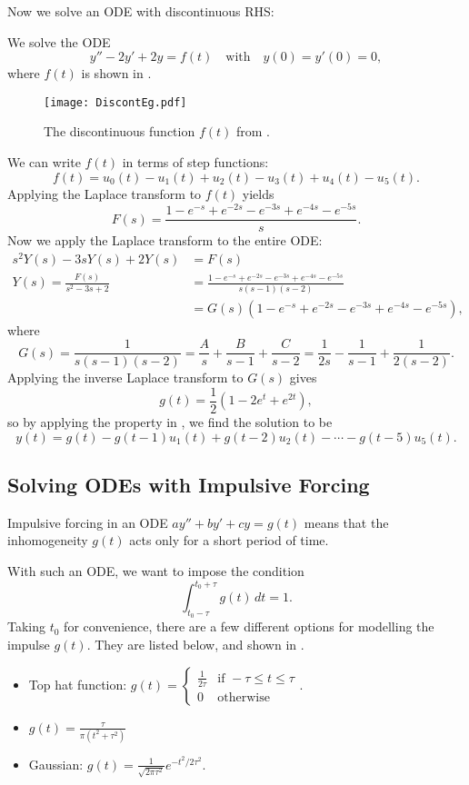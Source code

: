 Now we solve an ODE with discontinuous RHS:

\begin{eg}\label{eg:disconteg}
	We solve the ODE
	\[
	y''-2y'+2y=f(t) \quad\text{with}\quad y(0)=y'(0)=0,
	\]
	where $f(t)$ is shown in . 
	
	\begin{figure}[!ht]
		\centering
		\texttt{[image: DiscontEg.pdf]}
		\caption{The discontinuous function $f(t)$ from .}
		\label{fig:disconteg}
	\end{figure}
	
	We can write $f(t)$ in terms of step functions:
	\[
	f(t) = u_0(t) - u_1(t) + u_2(t) - u_3(t) + u_4(t) - u_5(t).
	\]
	Applying the Laplace transform to $f(t)$ yields
	\[
	F(s) = \frac{1-e^{-s}+e^{-2s}-e^{-3s}+e^{-4s}-e^{-5s}}{s}.
	\]
	Now we apply the Laplace transform to the entire ODE:
	\begin{align*}
		s^2Y(s) - 3sY(s) + 2Y(s) &= F(s) \\
		Y(s) = \frac{F(s)}{s^2-3s+2} &= \frac{1-e^{-s}+e^{-2s}-e^{-3s}+e^{-4s}-e^{-5s}}{s(s-1)(s-2)} \\
		&= G(s)(1-e^{-s}+e^{-2s}-e^{-3s}+e^{-4s}-e^{-5s}),
	\end{align*}
	where
	\[
	G(s) = \frac{1}{s(s-1)(s-2)} = \frac{A}{s} + \frac{B}{s-1} + \frac{C}{s-2} = \frac{1}{2s} - \frac{1}{s-1} + \frac{1}{2(s-2)}.
	\]
	Applying the inverse Laplace transform to $G(s)$ gives
	\[
	g(t) = \frac12\left(1 - 2e^t + e^{2t}\right),
	\]
	so by applying the property in , we find the solution to be
	\[
	y(t) = g(t) - g(t-1)u_1(t) + g(t-2)u_2(t) - \cdots - g(t-5)u_5(t).
	\]
\end{eg}

\subsection{Solving ODEs with Impulsive Forcing}

Impulsive forcing in an ODE $ay''+by'+cy=g(t)$ means that the inhomogeneity $g(t)$ acts only for a short period of time.

With such an ODE, we want to impose the condition
\[
\int_{t_0-\tau}^{t_0+\tau} g(t) \,dt = 1.
\]
Taking $t_0$ for convenience, there are a few different options for modelling the impulse $g(t)$. They are listed below, and shown in .
\begin{itemize}
	\item Top hat function: $g(t) = \begin{cases}\frac{1}{2\tau} & \text{if }-\tau \leq t \leq \tau \\ 0 & \text{otherwise}\end{cases}$.
	\item $g(t) = \frac{\tau}{\pi(t^2+\tau^2)}$
	\item Gaussian: $g(t) = \frac{1}{\sqrt{2\pi\tau^2}}e^{-t^2/2\tau^2}$.
\end{itemize}

